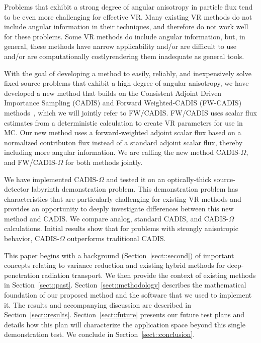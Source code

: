 \documentclass[12pt]{article}
\begin{document}
Problems that exhibit a strong degree of angular anisotropy in particle flux tend to be even more challenging for effective VR.
Many existing VR methods do not include angular information in their techniques, and therefore do not work well for these problems.  
Some VR methods do include angular information, but, in general, these methods have narrow applicability and/or are difficult to use and/or are computationally costly\textemdash rendering them inadequate as general tools.

With the goal of developing a method to easily, reliably, and inexpensively solve fixed-source problems that exhibit a high degree of angular anisotropy, we have developed a new method that builds on the Consistent Adjoint Driven Importance Sampling (CADIS) and Forward Weighted-CADIS (FW-CADIS) methods~\cite{wagner_forward-weighted_2007}, which we will jointly refer to FW/CADIS. 
FW/CADIS uses scalar flux estimates from a deterministic calculation to create VR parameters for use in MC.
Our new method uses a forward-weighted adjoint scalar flux based on a normalized contributon flux instead of a standard adjoint scalar flux, thereby including more angular information. 
We are calling the new method CADIS-$\Omega$, and FW/CADIS-$\Omega$ for both methods jointly.

We have implemented CADIS-$\Omega$ and tested it on an optically-thick source-detector labyrinth demonstration problem.
This demonstration problem has characteristics that are particularly challenging for existing VR methods and provides an opportunity to deeply investigate differences between this new method and CADIS.
We compare analog, standard CADIS, and CADIS-$\Omega$ calculations. 
Initial results show that for problems with strongly anisotropic behavior, CADIS-$\Omega$ outperforms traditional CADIS.

This paper begins with a background (Section~\ref{sect::second}) of important concepts relating to variance reduction and existing hybrid methods for deep-penetration radiation transport. 
We then provide the context of existing methods in Section~\ref{sect::past}. 
Section~\ref{sect::methodology} describes the mathematical foundation of our proposed method and the software that we used to implement it. 
The results and accompanying discussion are described in Section~\ref{sect::results}. Section~\ref{sect::future} presents our future test plans and details how this plan will characterize the application space beyond this single demonstration test. 
We conclude in Section~\ref{sect::conclusion}. 
\end{document}
